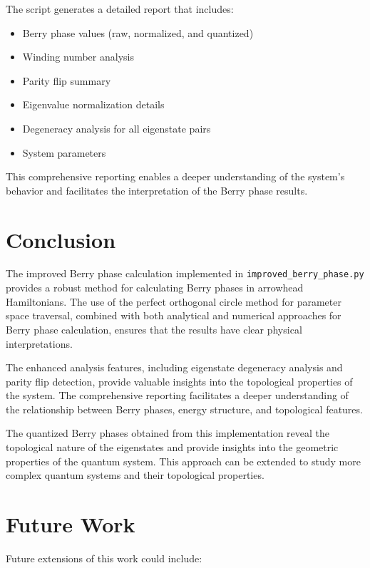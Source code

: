 \documentclass[12pt,a4paper]{article}
\begin{document}
The script generates a detailed report that includes:

\begin{itemize}
    \item Berry phase values (raw, normalized, and quantized)
    \item Winding number analysis
    \item Parity flip summary
    \item Eigenvalue normalization details
    \item Degeneracy analysis for all eigenstate pairs
    \item System parameters
\end{itemize}

This comprehensive reporting enables a deeper understanding of the system's behavior and facilitates the interpretation of the Berry phase results.

\section{Conclusion}

The improved Berry phase calculation implemented in \texttt{improved\_berry\_phase.py} provides a robust method for calculating Berry phases in arrowhead Hamiltonians. The use of the perfect orthogonal circle method for parameter space traversal, combined with both analytical and numerical approaches for Berry phase calculation, ensures that the results have clear physical interpretations.

The enhanced analysis features, including eigenstate degeneracy analysis and parity flip detection, provide valuable insights into the topological properties of the system. The comprehensive reporting facilitates a deeper understanding of the relationship between Berry phases, energy structure, and topological features.

The quantized Berry phases obtained from this implementation reveal the topological nature of the eigenstates and provide insights into the geometric properties of the quantum system. This approach can be extended to study more complex quantum systems and their topological properties.

\section{Future Work}

Future extensions of this work could include:
\end{document}
